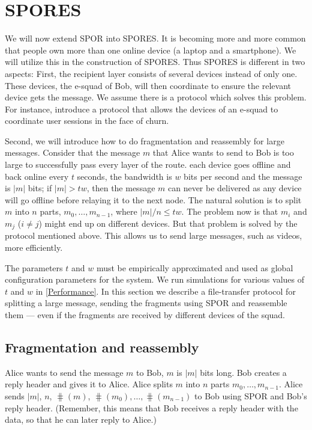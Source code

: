 \section{\Acf*{SPORES}}%
\label{SPORES}%

We will now extend \ac{SPOR} into \ac{SPORES}.
It is becoming more and more common that people own more than one online device 
(\eg a laptop and a smartphone).
We will utilize this in the construction of \ac{SPORES}.
Thus \ac{SPORES} is different in two aspects:
First, the recipient layer consists of several devices instead of only one.
These devices, the e-squad of Bob, will then coordinate to ensure the relevant 
device gets the message.
We assume there is a protocol which solves this problem.
For instance, \textcite{luxey:cascade} introduce a protocol that allows the 
devices of an e-squad to coordinate user sessions in the face of churn.

Second, we will introduce how to do fragmentation and reassembly for large 
messages.
Consider that the message \(m\) that Alice wants to send to Bob is too large to 
successfully pass every layer of the route.
\Eg each device goes offline and back online every \(t\) seconds, the bandwidth 
is \(w\) bits per second and the message is \(|m|\) bits; if \(|m| > t w\), 
then the message \(m\) can never be delivered as any device will go offline 
before relaying it to the next node.
The natural solution is to split \(m\) into \(n\) parts, \(m_0, \dotsc, 
  m_{n-1}\), where \(|m|/n\leq t w\).
The problem now is that \(m_i\) and \(m_j\) (\(i\neq j\)) might end up on 
different devices.
But that problem is solved by the protocol mentioned above.
This allows us to send large messages, such as videos, more efficiently.

The parameters \(t\) and \(w\) must be empirically approximated and used as 
global configuration parameters for the system.
We run simulations for various values of \(t\) and \(w\) in \cref{Performance}.
In this section we describe a file-transfer protocol for splitting a large 
message, sending the fragments using \ac{SPOR} and reassemble them --- even if 
the fragments are received by different devices of the squad.

\subsection{Fragmentation and reassembly}%
\label{sec:file_transfer}

Alice wants to send the message \(m\) to Bob, \(m\) is \(|m|\) bits long.
Bob creates a reply header and gives it to Alice.
Alice splits \(m\) into \(n\) parts \(m_0, \dotsc, m_{n-1}\).
Alice sends \(|m|\), \(n\), \(\hash(m)\), \(\hash(m_0), \dotsc, 
\hash(m_{n-1})\) to Bob using \ac{SPOR} and Bob's reply header.
(Remember, this means that Bob receives a reply header with the data, so that 
he can later reply to Alice.)

